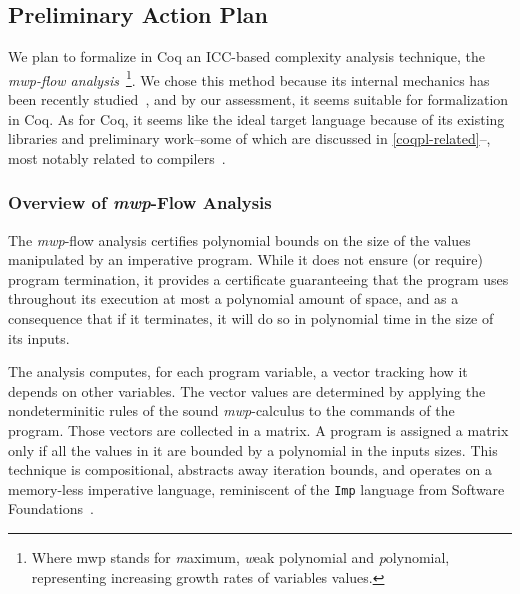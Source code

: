 \subsection{Preliminary Action Plan}  %

We plan to formalize in Coq an ICC-based complexity analysis technique, the \emph{mwp-flow analysis}~\cite{jones2009}\footnote{Where mwp stands for \emph{m}aximum, \emph{w}eak polynomial and \emph{p}olynomial, representing increasing growth rates of variables values.}.
We chose this method because its internal mechanics has been recently studied~\cite{aubert20222}, and by our assessment, it seems suitable for formalization in Coq.
As for Coq, it seems like the ideal target language because of its existing libraries and preliminary work--some of which are discussed in \autoref{coqpl-related}--, most notably related to compilers~\cite{leroy2009}.

\subsubsection{Overview of \emph{mwp}-Flow Analysis}

The \emph{mwp}-flow analysis certifies polynomial bounds on the size of the values manipulated by
an imperative program.
While it does not ensure (or require) program termination, it provides a certificate guaranteeing that the program uses throughout its execution at
most a polynomial amount of space, and as a consequence that if it terminates, it will do so in polynomial time in the size of its inputs.

The analysis computes, for each program variable, a vector tracking how it depends on other variables.
The vector values are determined by applying the nondeterminitic rules of the sound \emph{mwp}-calculus to the commands of the program.
Those vectors are collected in a matrix.
A program is assigned a matrix only if all the values in it are bounded by a polynomial in the inputs sizes.
This technique is compositional, abstracts away \eg iteration bounds, and operates on
a memory-less imperative language, reminiscent of the \texttt{Imp} language from Software Foundations~\cite%
{cpierce20221}.

